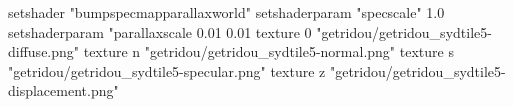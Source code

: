 setshader "bumpspecmapparallaxworld"
setshaderparam "specscale" 1.0
setshaderparam "parallaxscale 0.01 0.01
texture 0 "getridou/getridou_sydtile5-diffuse.png"
texture n "getridou/getridou_sydtile5-normal.png"
texture s "getridou/getridou_sydtile5-specular.png"
texture z "getridou/getridou_sydtile5-displacement.png"
